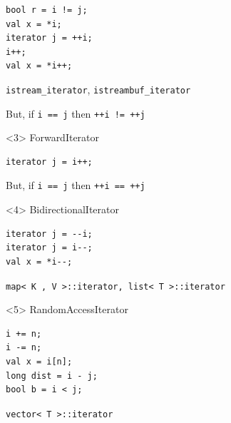\documentclass{beamer}
\begin{document}
\begin{frame}[fragile]
\begin{columns}[T]
\begin{column}{0.55\textwidth}
\begin{onlyenv}
         \begin{lstlisting}
bool r = i != j;
val x = *i;
iterator j = ++i;
i++;
val x = *i++;
         \end{lstlisting}
{\tt istream\_iterator}, {\tt istreambuf\_iterator}

          \vspace{2ex}
          But, if {\tt i == j} then {\tt ++i != ++j}
      \end{onlyenv}
      \begin{onlyenv}<3>
         ForwardIterator
         \begin{lstlisting}
iterator j = i++;
         \end{lstlisting}

          \vspace{2ex}
          But, if {\tt i == j} then {\tt ++i == ++j}
      \end{onlyenv}
      \begin{onlyenv}<4>
         BidirectionalIterator
         \begin{lstlisting}
iterator j = --i;
iterator j = i--;
val x = *i--;
         \end{lstlisting}
         {\tt map< K , V >::iterator, list< T >::iterator}
      \end{onlyenv}
      \begin{onlyenv}<5>
         RandomAccessIterator
         \begin{lstlisting}
i += n;
i -= n;
val x = i[n];
long dist = i - j;
bool b = i < j;
         \end{lstlisting}
         {\tt vector< T >::iterator}
      \end{onlyenv}
    \end{column}
  \end{columns}
\end{frame}
\end{document}
